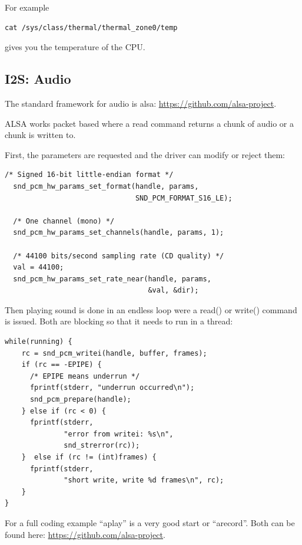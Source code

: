 \documentclass[12pt]{report}
\begin{document}
For example
\begin{verbatim}
cat /sys/class/thermal/thermal_zone0/temp
\end{verbatim}
gives you the temperature of the CPU.




\subsection{I2S: Audio}
The standard framework for audio is alsa: \url{https://github.com/alsa-project}.

ALSA works packet based where a read command
returns a chunk of audio or a chunk is written to.

First, the parameters are requested and the driver can modify or
reject them:
\begin{verbatim}
/* Signed 16-bit little-endian format */
  snd_pcm_hw_params_set_format(handle, params,
                               SND_PCM_FORMAT_S16_LE);

  /* One channel (mono) */
  snd_pcm_hw_params_set_channels(handle, params, 1);

  /* 44100 bits/second sampling rate (CD quality) */
  val = 44100;
  snd_pcm_hw_params_set_rate_near(handle, params,
                                  &val, &dir);
\end{verbatim}

Then playing sound is done in an endless loop were a read()
or write() command is issued. Both are blocking so that
it needs to run in a thread:

\begin{verbatim}
while(running) {
    rc = snd_pcm_writei(handle, buffer, frames);
    if (rc == -EPIPE) {
      /* EPIPE means underrun */
      fprintf(stderr, "underrun occurred\n");
      snd_pcm_prepare(handle);
    } else if (rc < 0) {
      fprintf(stderr,
              "error from writei: %s\n",
              snd_strerror(rc));
    }  else if (rc != (int)frames) {
      fprintf(stderr,
              "short write, write %d frames\n", rc);
    }
}
\end{verbatim}

For a full coding example ``aplay'' is a very
good start or ``arecord''. Both can be found here:
\url{https://github.com/alsa-project}.
\end{document}

